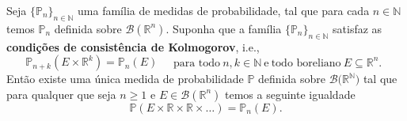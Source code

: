 \begin{teorema}
Seja $\{\mathbb{P}_n\}_{n\in\mathbb{N}}$ 
uma família de medidas de probabilidade, 
tal que para cada $n\in\mathbb{N}$ temos 
$\mathbb{P}_n$ definida 
sobre $\mathscr{B}(\mathbb{R}^{n})$. 
Suponha que a família $\{\mathbb{P}_n\}_{n\in\mathbb{N}}$  
satisfaz as 
\textbf{condições de consistência de Kolmogorov}, i.e.,
\[
\mathbb{P}_{n+k}(E\times\mathbb{R}^k)
=
\mathbb{P}_n(E)
\quad
\begin{array}{c}
\text{para todo}\ n,k\in\mathbb{N}\ \text{e}\ 
\text{todo boreliano}\ E\subseteq \mathbb{R}^n.
\end{array}
\]
Então existe uma única medida de probabilidade 
$\mathbb{P}$ definida sobre 
$\mathscr{B}\big(\mathbb{R}^{\mathbb{N}}\big)$
tal que para qualquer que seja $n\geq 1$ e 
$E\in \mathscr{B}(\mathbb{R}^{n})$ temos 
a seguinte igualdade 
\begin{equation}\label{teo-exis-kolmogorov-eq1}
\mathbb{P}(E\times\mathbb{R}\times\mathbb{R}\times\ldots)
=
\mathbb{P}_n(E).
\end{equation}
\end{teorema}




